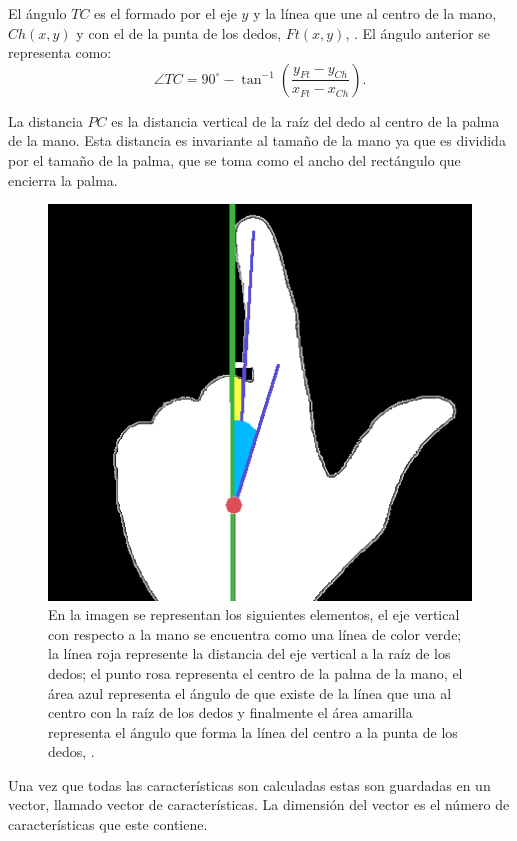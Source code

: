 El ángulo $TC$ es el formado por el eje $y$ y la línea que une al centro de la mano, $Ch(x,y)$ y con el de la punta de los dedos, $Ft(x,y)$, \citep{Sgouropoulos2014}. El  ángulo anterior se representa como:
\begin{equation}
\angle TC = 90^\circ - \tan^{-1} \left( \frac{ y_{Ft}-y_{Ch} }{ x_{Ft}-x_{Ch} } \right).
\end{equation}
 

La distancia $PC$ es la distancia vertical de la raíz del dedo al centro de la palma de la mano. Esta distancia es invariante al tamaño de la mano ya que es dividida por el tamaño de la palma, que se toma como el ancho del rectángulo que encierra la palma.  

\begin{figure}[h!]
\begin{center}
\includegraphics[scale=.6]{./Figures/angles.png}
\end{center}
\caption{En la imagen se representan los siguientes elementos, el eje vertical con respecto a la mano se encuentra como una línea de color verde; la línea roja represente la distancia del eje vertical a la raíz de los dedos; el punto rosa representa el centro de la palma de la mano, el área azul representa el ángulo de que existe de la línea que una al centro con la raíz de los dedos y finalmente el área amarilla representa el ángulo que forma la línea del centro a la punta de los dedos, \citep{Sgouropoulos2014}.}
\label{fig:anglesFingers}
\end{figure} 


Una vez que todas las características son calculadas estas son guardadas en un vector, llamado vector de características. La dimensión del vector es el número de características que este contiene. 


